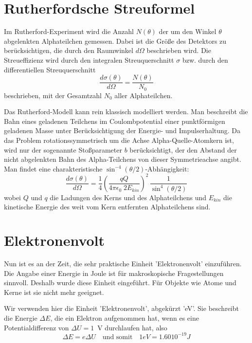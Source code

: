 \section{Rutherfordsche Streuformel}

Im Rutherford-Experiment wird die Anzahl $N(\theta)$ der um den Winkel $\theta$ abgelenkten Alphateilchen gemessen. Dabei ist die Größe des Detektors zu berücksichtigen, die durch den Raumwinkel $d\Omega$ beschrieben wird. Die Streueffizienz wird durch den integralen Streuquerschnitt $\sigma$ bzw. durch den differentiellen Streuquerschnitt  
\begin{equation}
    \frac{d \sigma(\theta)}{d\Omega} = \frac{N(\theta)}{N_0}
\end{equation}
beschrieben, mit der Gesamtzahl $N_0$ aller Alphateilchen.

Das Rutherford-Modell kann rein klassisch modelliert werden. Man beschreibt die Bahn eines geladenen Teilchens im Coulombpotential einer punktförmigen geladenen Masse unter Berücksichtigung der Energie- und Impulserhaltung. Da das Problem rotationssymmetrisch um die Achse Alpha-Quelle-Atomkern ist, wird nur der sogenannte Stoßparameter $b$ berücksichtigt, der den Abstand der nicht abgelenkten Bahn des Alpha-Teilchens von dieser Symmetrieachse angibt. Man findet  eine charakteristische $\sin^{-4} (\theta/2)$-Abhängigkeit:
\begin{equation}
    \frac{d \sigma(\theta)}{d\Omega} =
    \frac{1}{4} \left(
\frac{qQ}{4 \pi \epsilon_0 \; 2 E_{kin}}
    \right)^2 \, \frac{1}{\sin^4 (\theta/2)}
\end{equation}
wobei $Q$ und $q$ die Ladungen des Kerns und des Alphateilchens und $E_{kin}$ die kinetische Energie des weit vom Kern entfernten Alphateilchens sind.


\section{Elektronenvolt}

Nun ist es an der Zeit, die sehr praktische Einheit 'Elektronenvolt' einzuführen. Die Angabe einer Energie in Joule ist für makroskopische Fragestellungen sinnvoll. Deshalb wurde diese Einheit eingeführt. Für Objekte wie Atome und Kerne ist sie nicht mehr geeignet. 

Wir verwenden hier die Einheit 'Elektronenvolt', abgekürzt 'eV'. Sie beschreibt die Energie $\Delta E$, die ein Elektron aufgenommen hat, wenn es eine Potentialdifferenz von $\Delta U =1$~V durchlaufen hat, also 
\begin{equation}
    \Delta E = e \Delta U \quad \text{und somit} \quad \si{1}{eV} = \si{1.60 10^{-19}}{J}
\end{equation}

